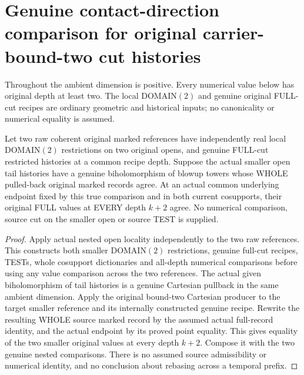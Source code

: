 \section{Genuine contact-direction comparison for original carrier-bound-two cut histories}

Throughout the ambient dimension is positive. Every numerical value below
has original depth at least two. The local DOMAIN$(2)$ and genuine original
FULL-cut recipes are ordinary geometric and historical inputs; no
canonicality or numerical equality is assumed.

\begin{lemma}
\label{hir:original-bound-two-full-cut-tail-isomorphism-values}
\leanok
Let two raw coherent original marked references have independently real
local DOMAIN$(2)$ restrictions on two original opens, and genuine FULL-cut
restricted histories at a common recipe depth. Suppose the actual smaller
open tail histories have a genuine biholomorphism of blowup towers whose
WHOLE pulled-back original marked records agree. At an actual common
underlying endpoint fixed by this true comparison and in both current
cosupports, their original FULL values at EVERY depth $k+2$ agree. No
numerical comparison, source cut on the smaller open or source TEST is
supplied.
\end{lemma}
\begin{proof}
Apply actual nested open locality independently to the two raw references.
This constructs both smaller DOMAIN$(2)$ restrictions, genuine full-cut
recipes, TESTs, whole cosupport dictionaries and all-depth numerical
comparisons before using any value comparison across the two references.
The actual given biholomorphism of tail histories is a genuine Cartesian
pullback in the same ambient dimension. Apply the original bound-two
Cartesian producer to the target smaller reference and its internally
constructed genuine recipe. Rewrite the resulting WHOLE source marked
record by the assumed actual full-record identity, and the actual endpoint
by its proved point equality. This gives equality of the two smaller
original values at every depth $k+2$. Compose it with the two genuine
nested comparisons. There is no assumed source admissibility or numerical
identity, and no conclusion about rebasing across a temporal prefix.
\end{proof}

